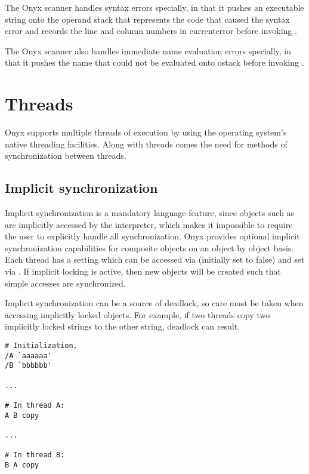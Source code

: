 The Onyx scanner handles syntax errors specially, in that it pushes an
executable string onto the operand stack that represents the code that caused
the syntax error and records the line and column numbers in currenterror before
invoking .

The Onyx scanner also handles immediate name evaluation errors specially, in
that it pushes the name that could not be evaluated onto ostack before invoking
.

\section{Threads}

Onyx supports multiple threads of execution by using the operating system's
native threading facilities.  Along with threads comes the need for methods of
synchronization between threads.

\subsection{Implicit synchronization}
\label{sec:onyx_implicit_synchronization}

Implicit synchronization is a mandatory language feature, since objects such as
 are implicitly accessed by the
interpreter, which makes it impossible to require the user to explicitly handle
all synchronization.  Onyx provides optional implicit synchronization
capabilities for composite objects on an object by object basis.  Each thread
has a setting which can be accessed via
 (initially set
to false) and set via .
If implicit locking is active, then new objects will be created such that simple
accesses are synchronized.

Implicit synchronization can be a source of deadlock, so care must be taken when
accessing implicitly locked objects.  For example, if two threads copy two
implicitly locked strings to the other string, deadlock can result.

\begin{verbatim}
# Initialization.
/A `aaaaaa'
/B `bbbbbb'

...

# In thread A:
A B copy

...

# In thread B:
B A copy
\end{verbatim}

